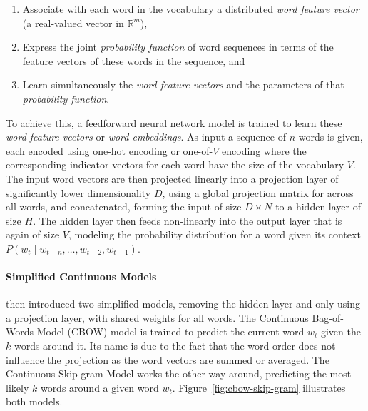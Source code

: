 \begin{enumerate}
  \item Associate with each word in the vocabulary a distributed \emph{word feature vector} (a real-valued vector in $\mathbb{R}^m$),
  \item Express the joint \emph{probability function} of word sequences in terms of the feature vectors of these words in the sequence, and
  \item Learn simultaneously the \emph{word feature vectors} and the parameters of that \emph{probability function}.
\end{enumerate}

To achieve this, a feedforward neural network model is trained to learn these \emph{word feature vectors} or \emph{word embeddings}. As input a sequence of $n$ words is given, each encoded using one-hot encoding or one-of-$V$ encoding where the corresponding indicator vectors for each word have the size of the vocabulary $V$. The input word vectors are then projected linearly into a projection layer of significantly lower dimensionality $D$, using a global projection matrix for across all words, and concatenated, forming the input of size $D \times N$ to a hidden layer of size $H$. The hidden layer then feeds non-linearly into the output layer that is again of size $V$, modeling the probability distribution for a word given its context $P(w_t \mid w_{t - n}, \ldots, w_{t - 2}, w_{t - 1})$.

\paragraph{Simplified Continuous Models}

\cite{Mikolov:2013ad} then introduced two simplified models, removing the hidden layer and only using a projection layer, with shared weights for all words. The Continuous Bag-of-Words Model (CBOW) model is trained to predict the current word $w_t$ given the $k$ words around it. Its name is due to the fact that the word order does not influence the projection as the word vectors are summed or averaged. The Continuous Skip-gram Model works the other way around, predicting the most likely $k$ words around a given word $w_t$. Figure~\ref{fig:cbow-skip-gram} illustrates both models.

